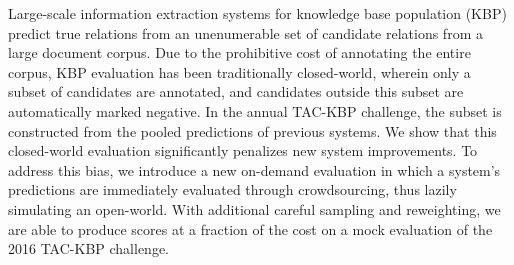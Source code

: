 Large-scale information extraction systems for knowledge base population (KBP)
predict true relations from an unenumerable set of candidate relations from a large document corpus.
Due to the prohibitive cost of annotating the entire corpus,
KBP evaluation has been traditionally closed-world,
wherein only a subset of candidates are annotated, %
and candidates outside this subset are automatically marked negative.
In the annual TAC-KBP challenge, the subset is constructed from the pooled predictions of previous systems.
We show that this closed-world evaluation significantly penalizes new system improvements.
To address this bias,
we introduce a new on-demand evaluation in which a system's predictions are immediately evaluated through crowdsourcing,
thus lazily simulating an open-world.
With additional careful sampling and reweighting,
we are able to produce scores at a fraction of the cost on a mock evaluation of the 2016 TAC-KBP challenge.



